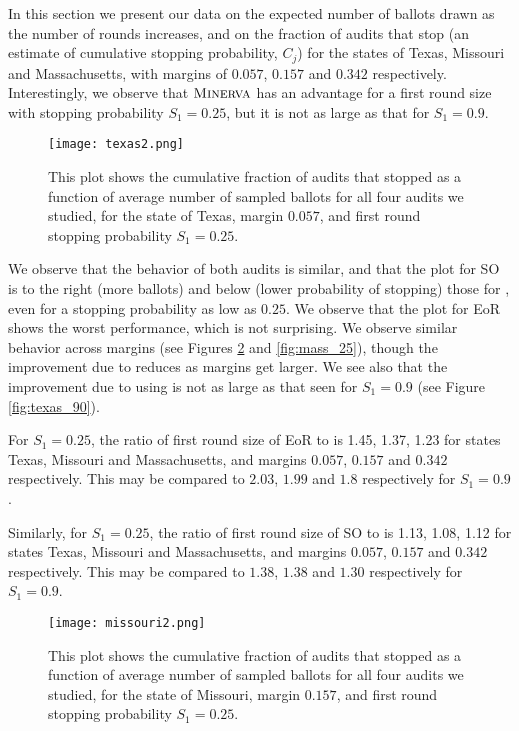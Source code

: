 In this section we present our data on the expected number of ballots drawn as the number of rounds increases, and on the fraction of audits that stop (an estimate of cumulative stopping probability, $C_j$) for the states of Texas, Missouri and Massachusetts, with margins of $0.057$, $0.157$ and $0.342$ respectively. Interestingly, we observe that $\textsc{Minerva}$ has an advantage for a first round size with stopping probability $S_1=0.25$, but it is not as large as that for $S_1=0.9$. 

\begin{figure}
\begin{centering}
\texttt{[image: texas2.png]}
\caption{This plot shows the cumulative fraction of audits that stopped as a function of average number of sampled ballots for all four audits we studied, for the state of Texas, margin $0.057$, and first round stopping probability $S_1=0.25$.}
\label{fig:texas_25}
\end{centering}
\end{figure}

We observe that the behavior of both \Minerva audits is similar, and that the plot for SO \BRAVO is to the right (more ballots) and below (lower probability of stopping) those for \Minerva, even for a stopping probability as low as $0.25$. We observe that the plot for EoR \BRAVO shows the worst performance, which is not surprising. We observe similar behavior across margins (see Figures \ref{fig:missouri_25} and \ref{fig:mass_25}), though the improvement due to \Minerva reduces as margins get larger. We see also that the improvement due to using \Minerva is not as large as that seen for $S_1=0.9$ (see Figure \ref{fig:texas_90}). 

For $S_1=0.25$, the ratio of first round size of EoR \BRAVO to \Minerva is 1.45, 1.37, 1.23 for states Texas, Missouri and Massachusetts, and margins $0.057$, $0.157$ and $0.342$ respectively. This may be compared to $2.03$, $1.99$ and $1.8$ respectively for $S_1=0.9$. 

Similarly, for $S_1=0.25$, the ratio of first round size of SO \BRAVO to \Minerva is 1.13, 1.08, 1.12 for states Texas, Missouri and Massachusetts, and margins $0.057$, $0.157$ and $0.342$ respectively. This may be compared to $1.38$, $1.38$ and $1.30$ respectively for $S_1=0.9$. 

\begin{figure}
\begin{centering}
\texttt{[image: missouri2.png]}
\caption{This plot shows the cumulative fraction of audits that stopped as a function of average number of sampled ballots for all four audits we studied, for the state of Missouri, margin $0.157$, and first round stopping probability $S_1=0.25$.}
\label{fig:missouri_25}
\end{centering}
\end{figure}

